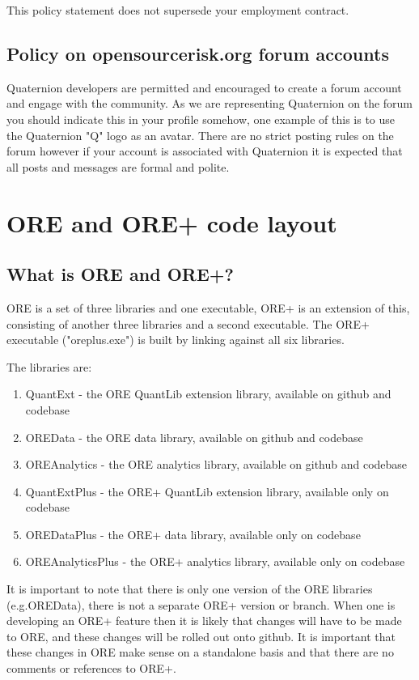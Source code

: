 \documentclass[12pt, a4paper]{article}
\begin{document}
This policy statement does not supersede your employment contract.

\subsection*{Policy on opensourcerisk.org forum accounts}
Quaternion developers are permitted and encouraged to create a forum account and engage with the community. As we are representing Quaternion on the forum you should indicate this in your profile somehow, one example of this is to use the Quaternion "Q" logo as an avatar. There are no strict posting rules on the forum however if your account is associated with Quaternion it is expected that all posts and messages are formal and polite.

\section*{ORE and ORE+ code layout}

\subsection*{What is ORE and ORE+?}
ORE is a set of three libraries and one executable, ORE+ is an extension of this, consisting of another three libraries and a second executable. The ORE+ executable ("oreplus.exe") is built by linking against all six libraries.

The libraries are:
\begin{enumerate}
\item QuantExt - the ORE QuantLib extension library, available on github and codebase
\item OREData - the ORE data library, available on github and codebase
\item OREAnalytics - the ORE analytics library, available on github and codebase
\item QuantExtPlus - the ORE+ QuantLib extension library, available only on codebase
\item OREDataPlus - the ORE+ data library, available only on codebase
\item OREAnalyticsPlus - the ORE+ analytics library, available only on codebase
\end{enumerate}

It is important to note that there is only one version of the ORE libraries (e.g.OREData),  there is not a separate ORE+ version or branch. When one is developing an ORE+ feature then it is likely that changes will have to be made to ORE, and these changes will be rolled out onto github. It is important that these changes in ORE make sense on a standalone basis and that there are no comments or references to ORE+.
\end{document}
